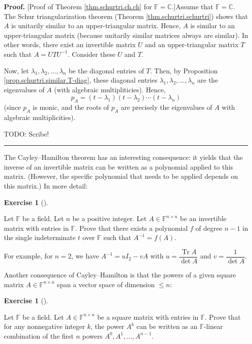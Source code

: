 \documentclass[numbers=enddot,12pt,final,onecolumn,notitlepage]{scrartcl}%
\newcounter{exer}
\numberwithin{exer}{subsection}
\theoremstyle{definition}
\newtheorem{exmp}[exer]{Exercise}
\newenvironment{exercise}[1][]
{\begin{exmp}[#1]\begin{leftbar}}
{\end{leftbar}\end{exmp}}
\newenvironment{proof}[1][Proof]{\noindent\textbf{#1.} }{\ \rule{0.5em}{0.5em}}
\begin{document}
\begin{proof}
[Proof of Theorem \ref{thm.schurtri.ch.ch} for $\mathbb{F}=\mathbb{C}$.]Assume
that $\mathbb{F}=\mathbb{C}$. The Schur triangularization theorem (Theorem
\ref{thm.schurtri.schurtri}) shows that $A$ is unitarily similar to an
upper-triangular matrix. Hence, $A$ is similar to an upper-triangular matrix
(because unitarily similar matrices always are similar). In other words, there
exist an invertible matrix $U$ and an upper-triangular matrix $T$ such that
$A=UTU^{-1}$. Consider these $U$ and $T$.

Now, let $\lambda_{1},\lambda_{2},\ldots,\lambda_{n}$ be the diagonal entries
of $T$. Then, by Proposition \ref{prop.schurtri.similar.T-diag}, these
diagonal entries $\lambda_{1},\lambda_{2},\ldots,\lambda_{n}$ are the
eigenvalues of $A$ (with algebraic multipliticies). Hence,%
\[
p_{A}=\left(  t-\lambda_{1}\right)  \left(  t-\lambda_{2}\right)
\cdots\left(  t-\lambda_{n}\right)
\]
(since $p_{A}$ is monic, and the roots of $p_{A}$ are precisely the
eigenvalues of $A$ with algebraic multiplicities).

TODO: Scribe!
\end{proof}

The Cayley--Hamilton theorem has an interesting consequence: it yields that
the inverse of an invertible matrix can be written as a polynomial applied to
this matrix. (However, the specific polynomial that needs to be applied
depends on this matrix.) In more detail:

\begin{exercise}
 Let $\mathbb{F}$ be a field. Let $n$ be a positive integer. Let
$A\in\mathbb{F}^{n\times n}$ be an invertible matrix with entries in
$\mathbb{F}$. Prove that there exists a polynomial $f$ of degree $n-1$ in the
single indeterminate $t$ over $\mathbb{F}$ such that $A^{-1}=f\left(
A\right)  $.
\end{exercise}

For example, for $n=2$, we have $A^{-1}=uI_{2}-vA$ with $u=\dfrac
{\operatorname*{Tr}A}{\det A}$ and $v=\dfrac{1}{\det A}$. \medskip

Another consequence of Cayley--Hamilton is that the powers of a given square
matrix $A\in\mathbb{F}^{n\times n}$ span a vector space of dimension $\leq n$:

\begin{exercise}
 Let $\mathbb{F}$ be a field. Let $A\in\mathbb{F}^{n\times n}$ be a
square matrix with entries in $\mathbb{F}$. Prove that for any nonnegative
integer $k$, the power $A^{k}$ can be written as an $\mathbb{F}$-linear
combination of the first $n$ powers $A^{0},A^{1},\ldots,A^{n-1}$.
\end{exercise}
\end{document}
